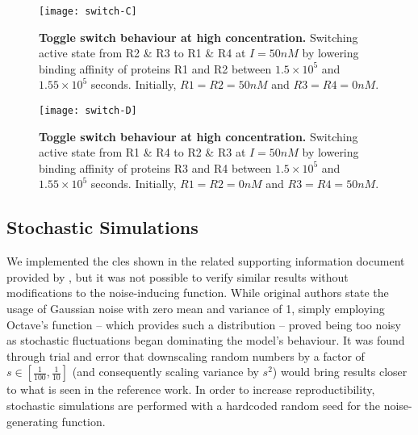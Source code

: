     \begin{figure}[!htb]
      \centering
      \texttt{[image: switch-C]}
      \caption{\textbf{Toggle switch behaviour at high concentration.} Switching active state from R2 \& R3 to R1 \& R4 at $I = 50 nM$ by lowering binding affinity of proteins R1 and R2 between $1.5 \times 10^5$ and $1.55 \times 10^5$ seconds. Initially, $R1 = R2 = 50nM$ and $R3 = R4 = 0nM$.}
      \label{fig:switch-C}
    \end{figure}
    \begin{figure}[!htb]
      \centering
      \texttt{[image: switch-D]}
      \caption{\textbf{Toggle switch behaviour at high concentration.} Switching active state from R1 \& R4 to R2 \& R3 at $I = 50 nM$ by lowering binding affinity of proteins R3 and R4 between $1.5 \times 10^5$ and $1.55 \times 10^5$ seconds. Initially, $R1 = R2 = 0nM$ and $R3 = R4 = 50nM$.}
      \label{fig:switch-D}
    \end{figure}


  \subsection{Stochastic Simulations}

    We implemented the \ac{cles} shown in the related supporting information document provided by \citet{multif}, but it was not possible to verify similar results without modifications to the noise-inducing function.
    While original authors state the usage of Gaussian noise with zero mean and variance of 1, simply employing Octave's  function -- which provides such a distribution \cite{randn} -- proved being too noisy as stochastic fluctuations began dominating the model's behaviour.
    It was found through trial and error that downscaling random numbers by a factor of $s \in [\frac{1}{100}, \frac{1}{10}]$ (and consequently scaling variance by $s^2$) would bring results closer to what is seen in the reference work.
    In order to increase reproductibility, stochastic simulations are performed with a hardcoded random seed for the noise-generating function.

